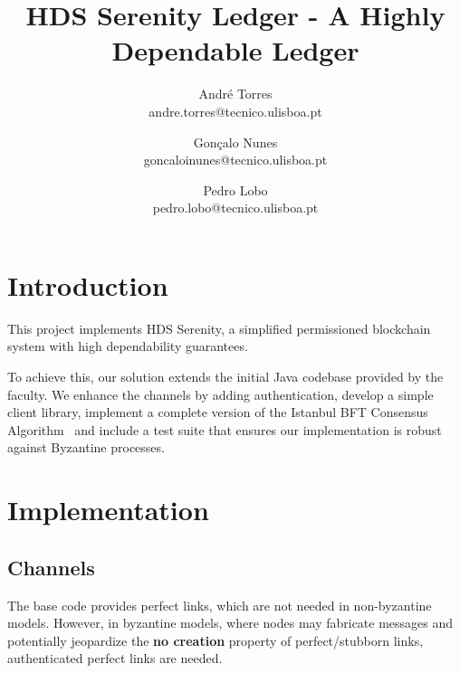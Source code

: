 \documentclass[letterpaper,twocolumn,10pt]{article}
\begin{document}
\date{}

\title{\Large \bf HDS Serenity Ledger - A Highly Dependable Ledger}

\author{
    {\rm André Torres}\\
    andre.torres@tecnico.ulisboa.pt
    \and
    {\rm Gonçalo Nunes}\\
    goncaloinunes@tecnico.ulisboa.pt
    \and
    {\rm Pedro Lobo}\\
    pedro.lobo@tecnico.ulisboa.pt
}


\maketitle

\section{Introduction}

This project implements HDS Serenity, a simplified permissioned blockchain system with high dependability guarantees.

To achieve this, our solution extends the initial Java codebase provided by the faculty. We enhance the channels by adding authentication, develop a simple client library, implement a complete version of the Istanbul BFT Consensus Algorithm~\cite{ibft} and include a test suite that ensures our implementation is robust against Byzantine processes.

\section{Implementation}

\subsection{Channels}

The base code provides perfect links, which are not needed in non-byzantine models. However, in byzantine models, where nodes may fabricate messages and potentially jeopardize the \textbf{no creation} property of perfect/stubborn links, authenticated perfect links are needed.
\end{document}
